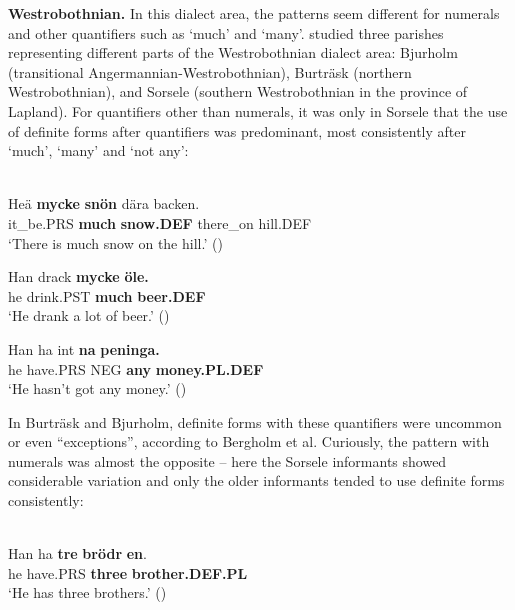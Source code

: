 
\textbf{Westrobothnian.} In this dialect area, the patterns seem different for numerals and other quantifiers such as ‘much’ and ‘many’. \citet{BergholmEtAl1999} studied three parishes representing different parts of the Westrobothnian dialect area: Bjurholm (transitional Angermannian-Westrobothnian), Burträsk (northern Westrobothnian), and Sorsele (southern Westrobothnian in the province of Lapland). For quantifiers other than numerals, it was only in Sorsele that the use of definite forms after quantifiers was predominant, most consistently after ‘much’, ‘many’ and ‘not any’:


\ea\label{}
\\
\gll Heä  \textbf{mycke} \textbf{snön} dära  backen.\\
it\_be.PRS  \textbf{much} \textbf{snow.DEF} there\_on  hill.DEF\\
\glt ‘There is much snow on the hill.’ (\citet[24]{BergholmEtAl1999})

\z

\ea
\gll Han  drack  \textbf{mycke} \textbf{öle.}\\
he  drink.PST  \textbf{much} \textbf{beer.DEF}\\
\glt ‘He drank a lot of beer.’ (\citet[24]{BergholmEtAl1999})

\z 

\ea
\gll Han  ha  int  \textbf{na} \textbf{peninga.}\\
he  have.PRS  NEG  \textbf{any} \textbf{money.PL.DEF}\\
\glt ‘He hasn’t got any money.’ (\citet[24]{BergholmEtAl1999})

\z

In Burträsk and Bjurholm, definite forms with these quantifiers were uncommon or even “exceptions”, according to Bergholm et al. Curiously, the pattern with numerals was almost the opposite – here the Sorsele informants showed considerable variation and only the older informants tended to use definite forms consistently:


\ea \label{} 
\\
\gll Han  ha  \textbf{tre} \textbf{brödr} \textbf{en}.\\
he  have.PRS  \textbf{three} \textbf{brother.DEF.PL}\\
\glt ‘He has three brothers.’ (\citet[24]{BergholmEtAl1999})


